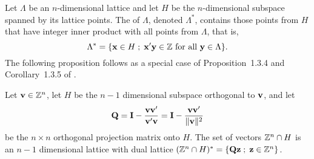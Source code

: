\documentclass[10pt,twocolumn,twoside]{IEEEtran}
\begin{document}
Let $\Lambda$ be an $n$-dimensional lattice and let $H$ be the $n$-dimensional subspace spanned by its lattice points. The  of $\Lambda$, denoted $\Lambda^*$, contains those points from $H$ that have integer inner product with all points from $\Lambda$, that is,
\[
\Lambda^* = \{ \mathbf{x}  \in H \; ; \; \mathbf{x}^\prime \mathbf{y} \in {\mathbb Z} \text{ for all } \mathbf{y} \in \Lambda \}.
\]
The following proposition follows as a special case of Proposition~1.3.4 and Corollary~1.3.5 of \cite{Martinet2003}.

\begin{proposition} \label{cor:intlatticedim1}
Let $\mathbf{v}\in{\mathbb Z}^n$, let $H$ be the $n-1$ dimensional subspace orthogonal to $\mathbf{v}$, and let
\[
\mathbf{Q} = \mathbf{I} - \frac{\mathbf{v}\mathbf{v}^\prime}{\mathbf{v}^\prime\mathbf{v}} = \mathbf{I} - \frac{\mathbf{v}\mathbf{v}^\prime}{\|\mathbf{v}\|^2}
\]
be the $n\times n$ orthogonal projection matrix onto $H$.  The set of vectors ${\mathbb Z}^n\cap H$ is an $n-1$ dimensional lattice with %
dual lattice $({\mathbb Z}^n \cap H)^* = \{ \mathbf{Q} \mathbf{z} \; ; \; \mathbf{z} \in {\mathbb Z}^n \}$.
\end{proposition}
\end{document}
